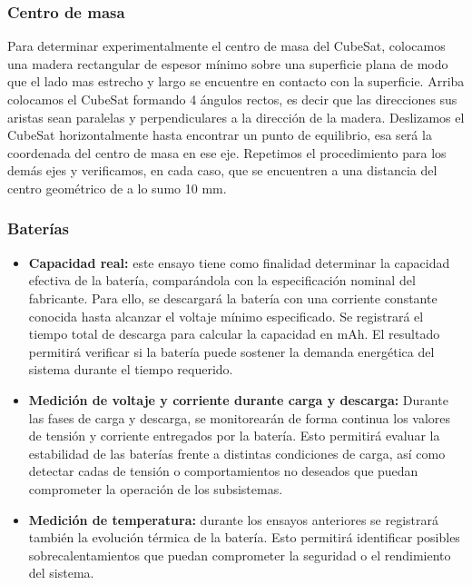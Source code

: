     \subsubsection{Centro de masa}
      Para determinar experimentalmente el centro de masa del CubeSat, colocamos una madera rectangular de espesor
      mínimo sobre una superficie plana de modo que el lado mas estrecho y largo se encuentre en contacto con la
      superficie. Arriba colocamos el CubeSat formando 4 ángulos rectos, es decir que las direcciones sus aristas sean
      paralelas y perpendiculares a la dirección de la madera. Deslizamos el CubeSat horizontalmente hasta encontrar un
      punto de equilibrio, esa será la coordenada del centro de masa en ese eje. Repetimos el procedimiento para los
      demás ejes y verificamos, en cada caso, que se encuentren a una distancia del centro geométrico de a lo sumo 10
      mm.

    \subsubsection{Baterías}
      \begin{itemize}
        \item \textbf{Capacidad real:} este ensayo tiene como finalidad determinar la capacidad efectiva de la batería,
          comparándola con la especificación nominal del fabricante. Para ello, se descargará la batería con una
          corriente constante conocida hasta alcanzar el voltaje mínimo especificado. Se registrará el tiempo total de
          descarga para calcular la capacidad en mAh.  El resultado permitirá verificar si la batería puede sostener la
          demanda energética del sistema durante el tiempo requerido.

        \item \textbf{Medición de voltaje y corriente durante carga y descarga:} Durante las fases de carga y descarga,
          se monitorearán de forma continua los valores de tensión y corriente entregados por la batería. Esto permitirá
          evaluar la estabilidad de las baterías frente a distintas condiciones de carga, así como detectar cadas de tensión
          o comportamientos no deseados que puedan comprometer la operación de los subsistemas.

        \item \textbf{Medición de temperatura:} durante los ensayos anteriores se registrará también la evolución
          térmica de la batería. Esto permitirá identificar posibles sobrecalentamientos que puedan comprometer la
          seguridad o el rendimiento del sistema.
      \end{itemize}

